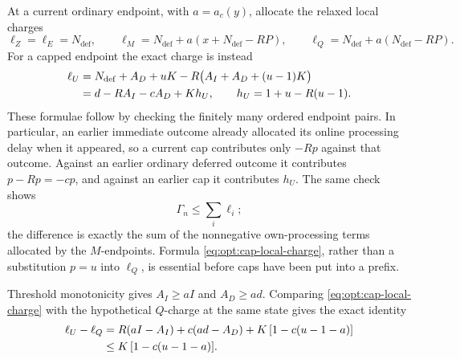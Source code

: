 At a current ordinary endpoint, with $a=a_c(y)$, allocate the relaxed
local charges
\begin{equation}
 \ell_Z=\ell_E=N_{\mathrm{def}},
 \qquad
 \ell_M=N_{\mathrm{def}}+a(x+N_{\mathrm{def}}-RP),
 \qquad
 \ell_Q=N_{\mathrm{def}}+a(N_{\mathrm{def}}-RP).
 \label{eq:opt:ordinary-local-charges}
\end{equation}
For a capped endpoint the exact charge is instead
\begin{align}
 \ell_U
 &=N_{\mathrm{def}}+A_D+uK-R\bigl(A_I+A_D+(u-1)K\bigr)
 \notag\\
 &=d-RA_I-cA_D+K h_U,
 \qquad
 h_U=1+u-R(u-1).
 \label{eq:opt:cap-local-charge}
\end{align}
These formulae follow by checking the finitely many ordered endpoint
pairs.  In particular, an earlier immediate outcome already allocated its
online processing delay when it appeared, so a current cap contributes
only $-Rp$ against that outcome.  Against an earlier ordinary deferred
outcome it contributes $p-Rp=-cp$, and against an earlier cap it
contributes $h_U$.  The same check shows
\begin{equation}
 \Gamma_n\le\sum_i\ell_i;
 \label{eq:opt:pair-allocation-dominates}
\end{equation}
the difference is exactly the sum of the nonnegative own-processing terms
allocated by the $M$-endpoints.  Formula
\eqref{eq:opt:cap-local-charge}, rather than a substitution $p=u$ into
$\ell_Q$, is essential before caps have been put into a prefix.

Threshold monotonicity gives $A_I\ge aI$ and $A_D\ge ad$.  Comparing
\eqref{eq:opt:cap-local-charge} with the hypothetical $Q$-charge at the
same state gives the exact identity
\begin{align}
 \ell_U-\ell_Q
 &=R(aI-A_I)+c(ad-A_D)
   +K\,[1-c(u-1-a)]
 \notag\\
 &\le K\,[1-c(u-1-a)].
 \label{eq:opt:cap-versus-q}
\end{align}

